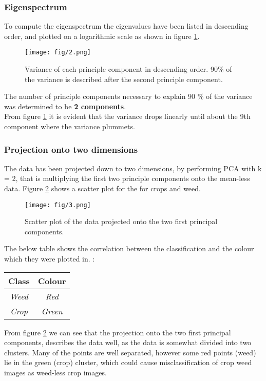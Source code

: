 \documentclass{article}
\begin{document}
\subsubsection{Eigenspectrum}
To compute the eigenspectrum the eigenvalues have been listed in descending order, and plotted on a logarithmic scale as shown in figure \ref{fig:eig}.
\begin{figure}[H]
  \centering
  \texttt{[image: fig/2.png]}
  \caption{Variance of each principle component in descending order. 90\% of the variance is described after the second principle component.}
  \label{fig:eig}
\end{figure}
The number of principle components necessary to explain 90 $\%$ of the variance was determined to be \textbf{2 components}. \\
From figure \ref{fig:eig} it is evident that the variance drops linearly until about the 9th component where the variance plummets.
\subsubsection{Projection onto two dimensions}
The data has been projected down to two dimensions, by performing PCA with k = 2, that is multiplying the first two principle components onto the mean-less data. Figure \ref{fig:scatter} shows a scatter plot for the for crops and weed.
\begin{figure}[H]
  \centering
  \texttt{[image: fig/3.png]}
  \caption{Scatter plot of the data projected onto the two first principal components.}
  \label{fig:scatter}
\end{figure}
The below table shows the correlation between the classification and the colour which they were plotted in. :
\begin{table}[H]
  \centering
  \begin{tabular}{|c|c|}
  \hline
    \textsf{Class} & \textsf{Colour}\\
    \hline
    \textsl{Weed} & \textsl{Red} \\
    \hline
    \textsl{Crop} & \textsl{Green} \\
    \hline
  \end{tabular}
\end{table}
From figure \ref{fig:scatter} we can see that the projection onto the two first principal components, describes the data well, as the data is somewhat divided into two clusters. Many of the points are well separated, however some red points (weed) lie in the green (crop) cluster, which could cause misclassification of crop weed images as weed-less crop images.
\end{document}
